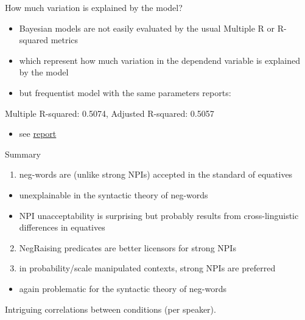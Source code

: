 \documentclass[
  ignorenonframetext,
]{beamer}
\providecommand{\tightlist}{%
  \setlength{\itemsep}{0pt}\setlength{\parskip}{0pt}}\usepackage{longtable,booktabs,array}
\begin{document}
\begin{frame}
\begin{block}{How much variation is explained by the model?}
\protect\hypertarget{how-much-variation-is-explained-by-the-model}{}
\begin{itemize}
\tightlist
\item
  Bayesian models are not easily evaluated by the usual Multiple R or
  R-squared metrics
\item
  which represent how much variation in the dependend variable is
  explained by the model
\item
  but frequentist model with the same parameters reports:
\end{itemize}

Multiple R-squared: 0.5074, Adjusted R-squared: 0.5057

\begin{itemize}
\tightlist
\item
  see \href{data_analysis.html}{report}
\end{itemize}
\end{block}
\end{frame}

\begin{frame}
\begin{block}{Summary}
\protect\hypertarget{summary}{}
\begin{enumerate}
\tightlist
\item
  neg-words are (unlike strong NPIs) accepted in the standard of
  equatives
\end{enumerate}

\begin{itemize}
\tightlist
\item
  unexplainable in the syntactic theory of neg-words
\item
  NPI unacceptability is surprising but probably results from
  cross-linguistic differences in equatives
\end{itemize}

\begin{enumerate}
\setcounter{enumi}{1}
\item
  NegRaising predicates are better licensors for strong NPIs
\item
  in probability/scale manipulated contexts, strong NPIs are preferred
\end{enumerate}

\begin{itemize}
\tightlist
\item
  again problematic for the syntactic theory of neg-words
\end{itemize}

Intriguing correlations between conditions (per speaker).
\end{block}
\end{frame}
\end{document}
